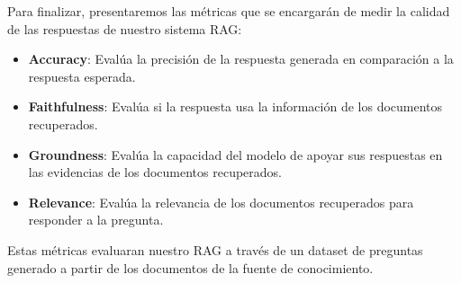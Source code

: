             Para finalizar, presentaremos las métricas que se encargarán de medir la calidad de las respuestas de nuestro sistema RAG:

            \begin{itemize}
                \item \textbf{Accuracy}: Evalúa la precisión de la respuesta generada en comparación a la respuesta esperada.
                \item \textbf{Faithfulness}: Evalúa si la respuesta usa la información de los documentos recuperados.
                \item \textbf{Groundness}: Evalúa la capacidad del modelo de apoyar sus respuestas en las evidencias de los documentos recuperados.
                \item \textbf{Relevance}: Evalúa la relevancia de los documentos recuperados para responder a la pregunta.
            \end{itemize}

            \noindent Estas métricas evaluaran nuestro RAG a través de un dataset de preguntas generado a partir de los documentos de la fuente de conocimiento.